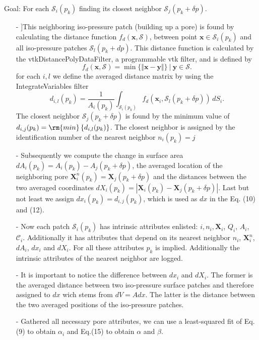 \documentclass[draft,jgrga]{agutexSI2019}
\begin{document}
\begin{article}
Goal: For each $\mathcal{S}_i(p_k)$ finding its closest neighbor $\mathcal{S}_j(p_k+\delta p)$.  
\begin{itemize}
	\item[-]]This neighboring iso-pressure patch (building up a pore) is found by calculating the distance function $f_d(\mathbf{x},\mathcal{S})$, between point $\mathbf{x}\in \mathcal{S}_i(p_k)$ and all iso-pressure patches $\mathcal{S}_l(p_k+dp)$. This distance function is calculated by the vtkDistancePolyDataFilter, a programmable vtk filter, and is defined by 
		\begin{equation}
			f_d\left(\mathbf{x},\mathcal{S}\right) = \min \{\Vert\mathbf{x}-\mathbf{y}\Vert \} ~|~ \mathbf{y}\in \mathcal{S}.
		\end{equation}
	for each $i,l$ we define the averaged distance matrix by using the IntegrateVariables filter
		\begin{equation}
			d_{i,l}(p_k) = \frac{1}{A_i(p_k)}\int_{\mathcal{S}_i(p_k)} f_d(\mathbf{x}_i,\mathcal{S}_l(p_k+\delta p)) \,dS_i.
		\end{equation}
	The closest neighbor $\mathcal{S}_j(p_k+\delta p)$ is found by the minimum value of $d_{i,j}(p_k) = \rm{min}\left\{ d_{i,l}(p_k)\right\}$. The closest neighbor is assigned by the identification number of the nearest neighbor $n_i(p_k) = j$ 
	\item[-] Subsequently we compute the change in surface area $dA_i(p_k) = A_i(p_k)-A_j(p_k+\delta p)$, the averaged location of the neighboring pore $\mathbf{X}^n_i(p_k) = \mathbf{X}_j(p_k+\delta p)$ and the distances between the two averaged coordinates $dX_i(p_k) = \left| \mathbf{X}_i(p_k)-\mathbf{X}_j(p_k+\delta p)\right|$. Last but not least we assign $dx_i(p_k) = d_{i,j}(p_k)$, which is used as $dx$ in the Eq. (10) and (12).
	\item[-] Now each patch $\mathcal{S}_i(p_k)$ has intrinsic attributes enlisted: $i, n_i, \mathbf{X}_i$, $Q_i$, $A_i$, $\mathcal{C}_i$. Additionally it has attributes that depend on its nearest neighbor $n_i$, $\mathbf{X}^n_i$, $dA_i$, $dx_i$ and $dX_i$. For all these attributes $p_k$ is implied. Additionally the intrinsic attributes of the nearest neighbor are logged. 
	\item[-] It is important to notice the difference between $dx_i$ and $dX_i$. The former is the averaged distance between two iso-pressure surface patches and therefore assigned to $dx$ wich stems from $dV = Adx$. The latter is the distance between the two averaged positions of the iso-pressure patches. 
	\item[-]Gathered all necessary pore attributes, we can use a least-squared fit of Eq.(9) to obtain $\alpha_i$ and Eq.(15) to obtain $\alpha$ and $\beta$. 
\end{itemize}



\end{article}
\end{document}
